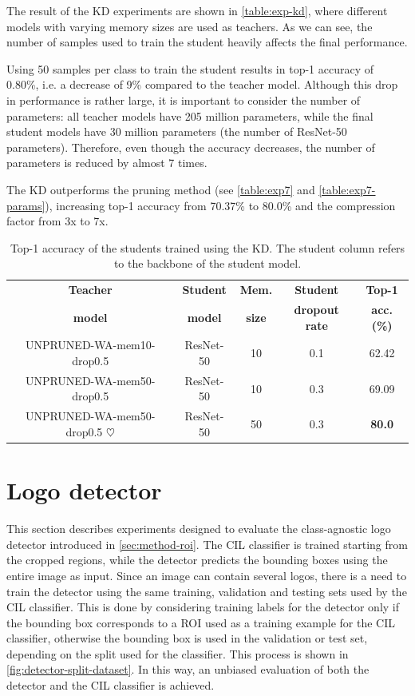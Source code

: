The result of the KD experiments are shown in \autoref{table:exp-kd}, where different models with varying memory sizes are used as teachers. As we can see, the number of samples used to train the student heavily affects the final performance.

Using 50 samples per class to train the student results in top-1 accuracy of 0.80\%, i.e. a decrease of 9\% compared to the teacher model.
Although this drop in performance is rather large, it is important to consider the number of parameters: all teacher models have 205 million parameters, while the final student models have 30 million parameters (the number of ResNet-50 parameters).
Therefore, even though the accuracy decreases, the number of parameters is reduced by almost 7 times.

The KD outperforms the pruning method (see \autoref{table:exp7} and \autoref{table:exp7-params}), increasing top-1 accuracy from 70.37\% to 80.0\% and the compression factor from 3x to 7x.

\begin{table}[H]
    \centering
    \begin{tabular}{c|c|c|c|c}
        \hline
        \textbf{Teacher} &
        \textbf{Student} &
        \textbf{Mem.} &
        \textbf{Student} &
        \textbf{Top-1} \\
        \textbf{model} &
        \textbf{model} &
        \textbf{size} &
        \textbf{dropout rate} &
        \textbf{acc. (\%)} \\
        \hline
        \hline
UNPRUNED-WA-mem10-drop0.5&ResNet-50&10&0.1&62.42\\
UNPRUNED-WA-mem50-drop0.5&ResNet-50&10&0.3&69.09\\
UNPRUNED-WA-mem50-drop0.5 $\heartsuit$&ResNet-50&50&0.3&\textbf{80.0}\\
\hline
\end{tabular}
\caption{Top-1 accuracy of the students trained using the KD. The student column refers to the backbone of the student model.}
    \label{table:exp-kd}
\end{table}


\section{Logo detector}
\label{sec:exp-det}
This section describes experiments designed to evaluate the class-agnostic logo detector introduced in \autoref{sec:method-roi}.
The CIL classifier is trained starting from the cropped regions, while the detector predicts the bounding boxes using the entire image as input.
Since an image can contain several logos, there is a need to train the detector using the same training, validation and testing sets used by the CIL classifier.
This is done by considering training labels for the detector only if the bounding box corresponds to a ROI used as a training example for the CIL classifier, otherwise the bounding box is used in the validation or test set, depending on the split used for the classifier.
This process is shown in \autoref{fig:detector-split-dataset}.
In this way, an unbiased evaluation of both the detector and the CIL classifier is achieved.

